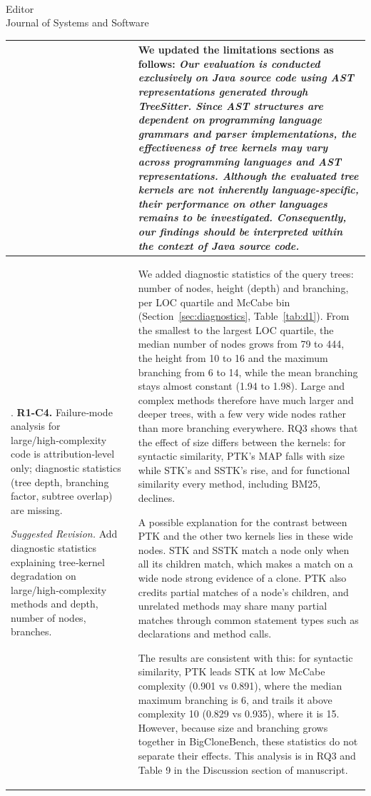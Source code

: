 \documentclass[
pagenumber=false, %
parskip=half, %
fromalign=right, %
foldmarks=false, %
addrfield=false %
]{scrlttr2}
\newcounter{commentcounter} %
\newcommand{\comment}[1]{\refstepcounter{commentcounter}\thecommentcounter.} %
\begin{document}
\begin{letter}{\\Editor\\Journal of Systems and Software}
\begin{longtable}{p{}p{}}
		 	
		 	 & We updated the limitations sections as follows:
			 \textit{Our evaluation is conducted exclusively on Java source code using AST representations generated through TreeSitter. Since AST structures are dependent on programming language grammars and parser implementations, the effectiveness of tree kernels may vary across programming languages and AST representations. Although the evaluated tree kernels are not inherently language-specific, their performance on other languages remains to be investigated. Consequently, our findings should be interpreted within the context of Java source code.} \\ \midrule 
			
			\comment{1} \textbf{R1-C4.} Failure‑mode analysis for large/high‑complexity code is attribution‑level only; diagnostic statistics (tree depth, branching factor, subtree overlap) are missing. \newline
			
			\textit{Suggested Revision.} Add diagnostic statistics explaining tree‑kernel degradation on large/high‑complexity methods and depth, number of nodes, branches. 
			& We added diagnostic statistics of the query trees: number of nodes, height (depth) and branching,
			per LOC quartile and McCabe bin (Section~\ref{sec:diagnostics}, Table~\ref{tab:d1}). From the smallest to the
			largest LOC quartile, the median number of nodes grows from 79 to 444, the height from 10 to 16 and
			the maximum branching from 6 to 14, while the mean branching stays almost constant (1.94 to 1.98).
			Large and complex methods therefore have much larger and deeper trees, with a few very wide nodes
			rather than more branching everywhere. RQ3 shows that the effect of size differs between the kernels:
			for syntactic similarity, PTK's MAP falls with size while STK's and SSTK's rise, and for functional
			similarity every method, including BM25, declines. 
			
			
			A possible explanation for the contrast between PTK and the other two kernels lies in these wide
			nodes. STK and SSTK match a node only when all its children match, which makes a match on a wide
			node strong evidence of a clone. PTK also credits partial matches of a node's children, and unrelated
			methods may share many partial matches
			through common statement types such as declarations and method calls.
			
			The results are consistent with this: for syntactic similarity, PTK leads
			STK at low McCabe complexity (0.901 vs 0.891), where the median maximum branching is 6, and trails it
			above complexity 10 (0.829 vs 0.935), where it is 15. However, because size and branching grows together in
			BigCloneBench, these statistics do not separate their effects. This analysis is in RQ3 and Table 9 in the Discussion section of manuscript.
			

\end{longtable}
\end{letter}
\end{document}
